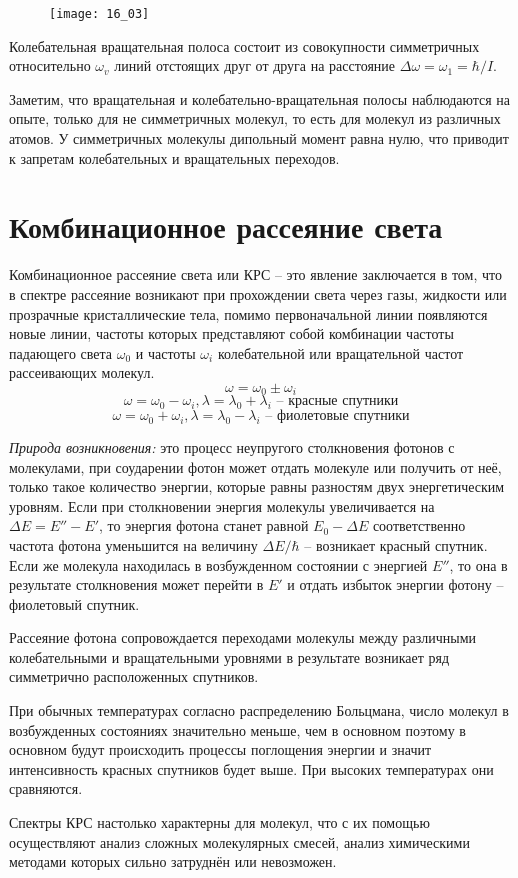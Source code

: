 \begin{figure}[h!]
    \center
    \texttt{[image: 16\_03]}
\end{figure}

Колебательная вращательная полоса состоит из совокупности симметричных 
относительно \( \omega_v \) линий отстоящих друг от друга на расстояние 
\( \Delta\omega = \omega_1 = \hbar/I \).

Заметим, что вращательная и колебательно-вращательная полосы наблюдаются 
на опыте, только для не симметричных молекул, то есть для молекул из 
различных атомов. У симметричных молекулы дипольный момент равна нулю, 
что приводит к запретам колебательных и вращательных переходов.

\section{Комбинационное рассеяние света}
Комбинационное рассеяние света или КРС -- это явление заключается в том, 
что в спектре рассеяние возникают при прохождении света через газы, 
жидкости или прозрачные кристаллические тела, помимо первоначальной линии 
появляются новые линии, частоты которых представляют собой комбинации 
частоты падающего света \( \omega_0 \) и частоты \( \omega_i \) 
колебательной или вращательной частот рассеивающих молекул.
\[ \omega = \omega_0 \pm \omega_i \]
\[ 
    \omega = \omega_0 - \omega_i, \lambda = \lambda_0 + \lambda_i 
    \text{ -- красные спутники}
\]
\[ 
    \omega = \omega_0 + \omega_i, \lambda = \lambda_0 - \lambda_i
    \text{ -- фиолетовые спутники}
\]

\emph{Природа возникновения: } это процесс неупругого столкновения фотонов 
с молекулами, при соударении фотон может отдать молекуле или получить от 
неё, только такое количество энергии, которые равны разностям двух 
энергетическим уровням. Если при столкновении энергия молекулы 
увеличивается на \( \Delta E = E'' - E' \), то энергия фотона станет 
равной \( E_0 - \Delta E \) соответственно частота фотона уменьшится на 
величину \( \Delta E / \hbar \) -- возникает красный спутник. Если же 
молекула находилась в возбужденном состоянии с энергией \( E'' \), то 
она в результате столкновения может перейти в \( E' \) и отдать избыток 
энергии фотону -- фиолетовый спутник.

Рассеяние фотона сопровождается переходами молекулы между различными 
колебательными и вращательными уровнями в результате возникает ряд 
симметрично расположенных спутников. 

При обычных температурах согласно распределению Больцмана, число молекул 
в возбужденных состояниях значительно меньше, чем в основном поэтому в 
основном будут происходить процессы поглощения энергии и значит 
интенсивность красных спутников будет выше. При высоких температурах 
они сравняются.

Спектры КРС настолько характерны для молекул, что с их помощью осуществляют 
анализ сложных молекулярных смесей, анализ химическими методами 
которых сильно затруднён или невозможен.

\newpage
